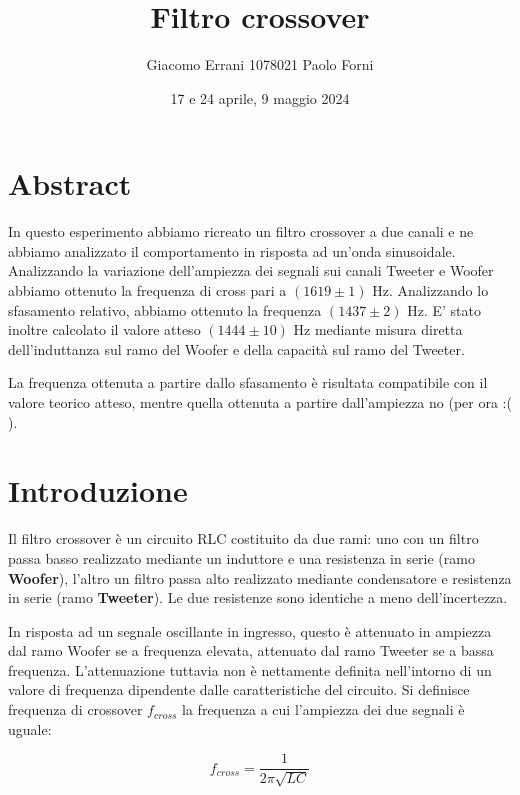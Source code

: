 \documentclass[12pt,a4paper]{article}
\title{Filtro crossover} %
\date{17 e 24 aprile, 9 maggio 2024}
\author{Giacomo Errani 1078021 Paolo Forni}
\begin{document}
\newcommand{\theoryF}{ $(1444 \pm 10)$ Hz}
\newcommand{\amplitudeF}{$(1619 \pm 1)$ Hz}
\newcommand{\phaseF}{$(1437 \pm 2)$ Hz}

\maketitle

\section{Abstract}

\indent In questo esperimento abbiamo ricreato un filtro crossover a due canali e ne abbiamo analizzato il comportamento in risposta ad un'onda sinusoidale. Analizzando la variazione dell'ampiezza dei segnali sui canali Tweeter e Woofer abbiamo ottenuto la frequenza di cross pari a \amplitudeF. Analizzando lo sfasamento relativo, abbiamo ottenuto la frequenza \phaseF. E' stato inoltre calcolato il valore atteso \theoryF \hspace{1pt} mediante misura diretta dell'induttanza sul ramo del Woofer e della capacità sul ramo del Tweeter. 

La frequenza ottenuta a partire dallo sfasamento è risultata compatibile con il valore teorico atteso, mentre quella ottenuta a partire dall'ampiezza no (per ora :( ).

\section{Introduzione}
Il filtro crossover è un circuito RLC costituito da due rami: uno con un filtro passa basso realizzato mediante un induttore e una resistenza in serie (ramo \textbf{Woofer}), l'altro un filtro passa alto realizzato mediante condensatore e resistenza in serie (ramo \textbf{Tweeter}). Le due resistenze sono identiche a meno dell'incertezza.

In risposta ad un segnale oscillante in ingresso, questo è attenuato in ampiezza dal ramo Woofer se a frequenza elevata, attenuato dal ramo Tweeter se a bassa frequenza. L'attenuazione tuttavia non è nettamente definita nell'intorno di un valore di frequenza dipendente dalle caratteristiche del circuito. Si definisce frequenza di crossover $f_{cross}$ la frequenza a cui l'ampiezza dei due segnali è uguale:

\begin{equation}
\label{eqn:fcross}
f_{cross} = \frac{1}{2 \pi \sqrt{LC} }
\end{equation}
\end{document}
